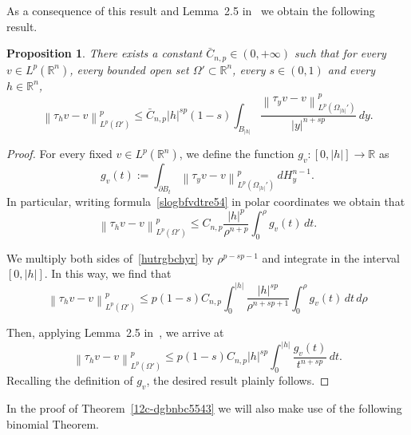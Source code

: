 \documentclass[12pt]{article}
\newcommand{\R}{\mathbb{R}}
\numberwithin{equation}{section}
\newtheorem{prop}[thm]{Proposition}
\renewcommand{\leq}{\leqslant}
\begin{document}
\begin{appendix}
As a consequence of this result and Lemma~2.5 in~\cite{MR4544090} we obtain the following result. 
\begin{prop}\label{hndvcfwslop8}
There exists a constant $\bar{C}_{n,p}\in(0,+\infty)$ such that for every $v\in L^p(\R^n)$, every bounded open set $\Omega'\subset\R^n$, every $s\in(0,1)$ and every $h\in\R^n$, 
\begin{equation*}
\left\|\tau_h v-v\right\|_{L^p\left(\Omega'\right)}^p\leq \bar{C}_{n,p}\left|h\right|^{sp}(1-s)\int_{B_{\left|h\right|}} \frac{\left\|\tau_y v-v\right\|_{L^p\left(\Omega_{\left|h\right|}'\right)}^p}{\left|y\right|^{n+sp}}\,dy.
\end{equation*}  
\end{prop}


\begin{proof}
For every fixed $v\in L^p(\R^n)$, we define the function $g_v:[0,\left|h\right|]\to \R$ as 
\begin{equation*}
g_v(t):=\int_{\partial B_t} \left\|\tau_y v-v\right\|_{L^p\left(\Omega_{\left|h\right|}'\right)}^p\,dH_{y}^{n-1}.
\end{equation*} 
In particular, writing formula~\eqref{slogbfvdtre54} in polar coordinates we obtain that 
\begin{equation}\label{hutrgbchyr}
\left\|\tau_h v-v\right\|_{L^p(\Omega')}^p\leq C_{n,p} \frac{\left|h\right|^p}{\rho^{n+p}} \int_{0}^\rho g_v(t)\,dt. 
\end{equation}

We multiply both sides of~\eqref{hutrgbchyr} by $\rho^{p-sp-1}$ and integrate in the interval $\left[0,\left|h\right|\right]$. In this way, we find that
\begin{equation*}
 \left\|\tau_h v-v\right\|_{L^p(\Omega')}^p\leq p(1-s)C_{n,p} \int_{0}^{\left|h\right|}\frac{\left|h\right|^{sp}}{\rho^{n+sp+1}}\int_{0}^\rho g_v(t)\,dt\,d\rho
\end{equation*} 

Then, applying Lemma~2.5 in~\cite{MR4544090}, we arrive at
\begin{equation*}
 \left\|\tau_h v-v\right\|_{L^p(\Omega')}^p\leq p(1-s)C_{n,p} \left|h\right|^{sp}\int_{0}^{\left|h\right|}\frac{g_v(t)}{t^{n+sp}}\,dt.
\end{equation*}
Recalling the definition of $g_v$, the desired result plainly follows. 
\end{proof}

In the proof of Theorem~\ref{12c-dgbnbc5543} we will also make use of the following binomial Theorem. 


\end{appendix}
\end{document}
